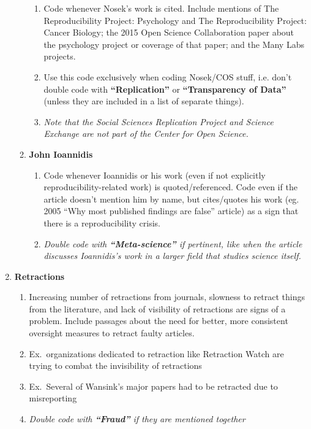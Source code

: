 \documentclass[
]{scrartcl}
\begin{document}
\begin{enumerate}
\begin{enumerate}
    \begin{enumerate}
    
    \item
      Code whenever Nosek's work is cited. Include mentions of The
      Reproducibility Project: Psychology and The Reproducibility
      Project: Cancer Biology; the 2015 Open Science Collaboration paper
      about the psychology project or coverage of that paper; and the
      Many Labs projects.
    \item
      Use this code exclusively when coding Nosek/COS stuff, i.e. don't
      double code with \textbf{``Replication''} or
      \textbf{``Transparency of Data''} (unless they are included in a
      list of separate things).
    \item
      \emph{Note that the Social Sciences Replication Project and
      Science Exchange are not part of the Center for Open Science.}
    \end{enumerate}
  \item
    \textbf{John Ioannidis}

    \begin{enumerate}
    
    \item
      Code whenever Ioannidis or his work (even if not explicitly
      reproducibility-related work) is quoted/referenced. Code even if
      the article doesn't mention him by name, but cites/quotes his work
      (eg. 2005 ``Why most published findings are false'' article) as a
      sign that there is a reproducibility crisis.
    \item
      \emph{Double code with \textbf{``Meta-science''} if pertinent,
      like when the article discusses Ioannidis's work in a larger field
      that studies science itself.}
    \end{enumerate}
  \end{enumerate}
\item
  \textbf{Retractions}

  \begin{enumerate}

  \item
    Increasing number of retractions from journals, slowness to retract
    things from the literature, and lack of visibility of retractions
    are signs of a problem. Include passages about the need for better,
    more consistent oversight measures to retract faulty articles.
  \item
    Ex.~organizations dedicated to retraction like Retraction Watch are
    trying to combat the invisibility of retractions
  \item
    Ex.~Several of Wansink's major papers had to be retracted due to
    misreporting
  \item
    \emph{Double code with \textbf{``Fraud''} if they are mentioned
    together}
  \end{enumerate}
\end{enumerate}
\end{document}
